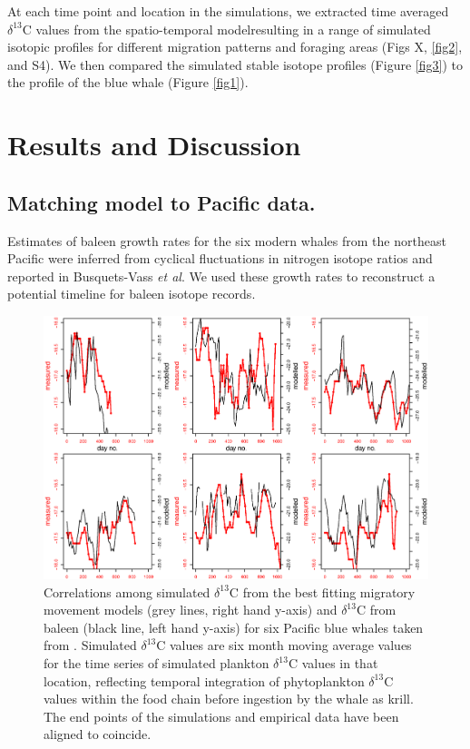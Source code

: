 \documentclass[a4paper,12pt]{article}
\begin{document}
At each time point and location in the simulations, we extracted time averaged \(\delta^{13}\)C values from the spatio-temporal model\cite{magozzi2017using}resulting in a range of simulated isotopic profiles for different migration patterns and foraging areas (Figs X, \ref{fig2}, and S4). %
We then compared the simulated stable isotope profiles (Figure \ref{fig3}) to the profile of the blue whale (Figure \ref{fig1}).

\section{Results and Discussion}

\subsection{Matching model to Pacific data.}

Estimates of baleen growth rates for the six modern whales from the northeast Pacific were inferred from cyclical fluctuations in nitrogen isotope ratios and reported in Busquets-Vass \textit{et al}\cite{busquets2017estimating}. 
We used these growth rates to reconstruct a potential timeline for baleen isotope records.

\begin{figure}
 \centering
  \includegraphics[width = \linewidth]{figures/figure-Pacific-draft.eps}
  \caption{Correlations among simulated $\delta^{13}$C from the best fitting migratory movement models (grey lines, right hand y-axis) and $\delta^{13}$C from baleen (black line, left hand y-axis) for six Pacific blue whales taken from \cite{busquets2017estimating}. 
  Simulated $\delta^{13}$C values are six month moving average values for the time series of simulated plankton $\delta^{13}$C values in that location, reflecting temporal integration of phytoplankton $\delta^{13}$C values within the food chain before ingestion by the whale as krill. 
  The end points of the simulations and empirical data have been aligned to coincide.
}
  \label{pacific}
\end{figure}
\end{document}
